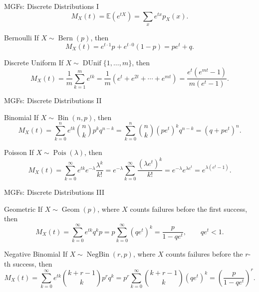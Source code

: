 \begin{frame}{MGFs: Discrete Distributions I}
\small
\[
M_X(t)=\mathbb{E}(e^{tX})=\sum_x e^{tx}p_X(x).
\]

\begin{keybox}{Bernoulli}
If \(X\sim\operatorname{Bern}(p)\), then
\[
M_X(t)=e^{t\cdot 1}p+e^{t\cdot 0}(1-p)=pe^t+q.
\]
\end{keybox}

\begin{keybox}{Discrete Uniform}
If \(X\sim\operatorname{DUnif}\{1,\dots,m\}\), then
\[
M_X(t)=\frac1m\sum_{k=1}^m e^{tk}
=\frac1m\left(e^t+e^{2t}+\cdots+e^{mt}\right)
=\frac{e^t(e^{mt}-1)}{m(e^t-1)}.
\]
\end{keybox}

\end{frame}





\begin{frame}{MGFs: Discrete Distributions II}

\small

\begin{keybox}{Binomial}
If \(X\sim\operatorname{Bin}(n,p)\), then
\[
M_X(t)=\sum_{k=0}^n e^{tk}\binom{n}{k}p^kq^{n-k}
=\sum_{k=0}^n \binom{n}{k}(pe^t)^kq^{n-k}
=(q+pe^t)^n.
\]
\end{keybox}

\begin{keybox}{Poisson}
If \(X\sim\operatorname{Pois}(\lambda)\), then
\[
M_X(t)=\sum_{k=0}^{\infty} e^{tk}e^{-\lambda}\frac{\lambda^k}{k!}
=e^{-\lambda}\sum_{k=0}^{\infty}\frac{(\lambda e^t)^k}{k!}
=e^{-\lambda}e^{\lambda e^t}
=e^{\lambda(e^t-1)}.
\]
\end{keybox}

\end{frame}



\begin{frame}{MGFs: Discrete Distributions III}

\small

\begin{keybox}{Geometric}
If \(X\sim\operatorname{Geom}(p)\), where \(X\) counts failures before the first success, then
\[
M_X(t)=\sum_{k=0}^{\infty} e^{tk}q^kp
=p\sum_{k=0}^{\infty}(qe^t)^k
=\frac{p}{1-qe^t},
\qquad qe^t<1.
\]
\end{keybox}

\begin{keybox}{Negative Binomial}
If \(X\sim\operatorname{NegBin}(r,p)\), where \(X\) counts failures before the \(r\)-th success, then
\[
M_X(t)=\sum_{k=0}^{\infty}e^{tk}\binom{k+r-1}{k}p^rq^k
=p^r\sum_{k=0}^{\infty}\binom{k+r-1}{k}(qe^t)^k
=\left(\frac{p}{1-qe^t}\right)^r.
\]
\end{keybox}

\end{frame}



